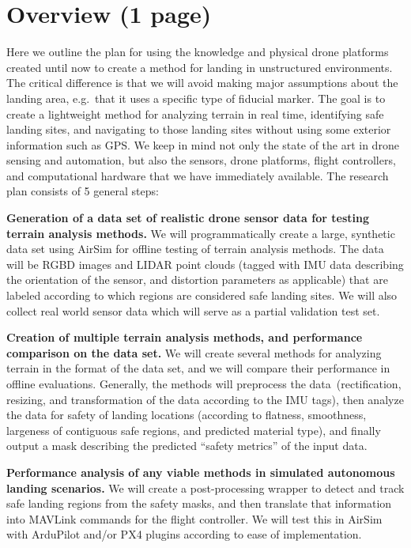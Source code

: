 \section{Overview (1 page)}
\label{section:research_plan_overview}

Here we outline the plan for using the knowledge and physical drone platforms created
until now to create a method for landing in unstructured environments.
The critical difference is that we will avoid making major assumptions about the landing area,
e.g.~that it uses a specific type of fiducial marker.
The goal is to create a lightweight method for analyzing terrain in real time,
identifying safe landing sites,
and navigating to those landing sites without using some exterior information such as GPS.
We keep in mind not only the state of the art in drone sensing and automation,
but also the sensors, drone platforms, flight controllers,
and computational hardware that we have immediately available.
The research plan consists of 5 general steps:

\textbf{Generation of a data set of realistic drone sensor data for testing terrain analysis methods.}
We will programmatically create a large, synthetic data set using AirSim for offline testing of terrain analysis methods.
The data will be RGBD images and LIDAR point clouds (tagged with IMU data describing the orientation of the sensor, and distortion parameters as applicable)
that are labeled according to which regions are considered safe landing sites.
We will also collect real world sensor data which will serve as a partial validation test set.

\textbf{Creation of multiple terrain analysis methods, and performance comparison on the data set.}
We will create several methods for analyzing terrain in the format of the data set,
and we will compare their performance in offline evaluations.
Generally, the methods will preprocess the data~(rectification, resizing, and transformation of the data according to the IMU tags),
then analyze the data for safety of landing locations (according to flatness, smoothness, largeness of contiguous safe regions, and predicted material type),
and finally output a mask describing the predicted ``safety metrics'' of the input data.

\textbf{Performance analysis of any viable methods in simulated autonomous landing scenarios.}
We will create a post-processing wrapper to detect and track safe landing regions from the safety masks,
and then translate that information into MAVLink commands for the flight controller.
We will test this in AirSim with ArduPilot and/or PX4 plugins according to ease of implementation.

